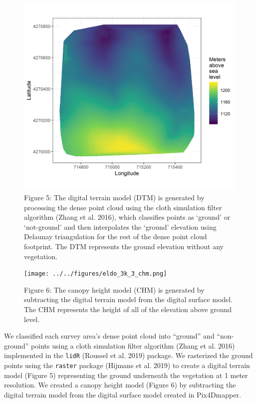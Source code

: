 \documentclass[]{article}
\begin{document}
\begin{figure}
\centering
\includegraphics{../../figures/eldo_3k_3_dtm.png}
\caption{Figure 5: The digital terrain model (DTM) is generated by
processing the dense point cloud using the cloth simulation filter
algorithm (Zhang et al. 2016), which classifies points as `ground' or
`not-ground' and then interpolates the `ground' elevation using Delaunay
triangulation for the rest of the dense point cloud footprint. The DTM
represents the ground elevation without any vegetation.}
\end{figure}

\begin{figure}
\centering
\texttt{[image: ../../figures/eldo\_3k\_3\_chm.png]}
\caption{Figure 6: The canopy height model (CHM) is generated by
subtracting the digital terrain model from the digital surface model.
The CHM represents the height of all of the elevation above ground
level.}
\end{figure}

We classified each survey area's dense point cloud into ``ground'' and
``non-ground'' points using a cloth simulation filter algorithm (Zhang
et al. 2016) implemented in the \texttt{lidR} (Roussel et al. 2019)
package. We rasterized the ground points using the \texttt{raster}
package (Hijmans et al. 2019) to create a digital terrain model (Figure
5) representing the ground underneath the vegetation at 1 meter
resolution. We created a canopy height model (Figure 6) by subtracting
the digital terrain model from the digital surface model created in
Pix4Dmapper.
\end{document}
